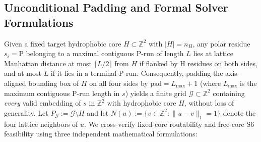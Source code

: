 \documentclass[11pt]{article}
\newcommand{\Z}{\mathbb{Z}}
\begin{document}
\subsection{Unconditional Padding and Formal Solver Formulations}\label{sec:formulations}

Given a fixed target hydrophobic core $H \subset \Z^2$ with $|H| = n_H$, any polar residue $s_i = \mathrm{P}$ belonging to a maximal contiguous P-run of length $L$ lies at lattice Manhattan distance at most $\lceil L/2 \rceil$ from $H$ if flanked by H residues on both sides, and at most $L$ if it lies in a terminal P-run. Consequently, padding the axis-aligned bounding box of $H$ on all four sides by $\mathrm{pad} = L_{\max} + 1$ (where $L_{\max}$ is the maximum contiguous P-run length in $s$) yields a finite grid $\mathcal{G} \subset \Z^2$ containing \emph{every} valid embedding of $s$ in $\Z^2$ with hydrophobic core $H$, without loss of generality. Let $P_{\mathcal{G}} := \mathcal{G} \setminus H$ and let $N(u) := \{v \in \Z^2 : \|u - v\|_1 = 1\}$ denote the four lattice neighbors of $u$. We cross-verify fixed-core routability and free-core S6 feasibility using three independent mathematical formulations:
\end{document}
